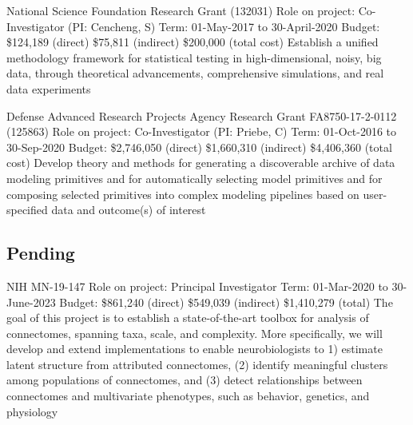 \documentclass[10pt,colorlinks=true,urlcolor=blue]{moderncv}
\begin{document}
{\newline National Science Foundation Research Grant (132031)
\newline Role on project: Co-Investigator (PI: Cencheng, S)
\newline Term: 01-May-2017 to 30-April-2020
\newline Budget: \$124,189 (direct) \$75,811 (indirect) \$200,000 (total cost)
\newline Establish a unified methodology framework for statistical testing in high-dimensional, noisy,
big data, through theoretical advancements, comprehensive simulations, and real data
experiments}{}{}{}{}

{\newline Defense Advanced Research Projects Agency Research Grant FA8750-17-2-0112 (125863)
\newline Role on project: Co-Investigator (PI: Priebe, C)
\newline Term: 01-Oct-2016 to 30-Sep-2020
\newline Budget: \$2,746,050 (direct) \$1,660,310 (indirect) \$4,406,360 (total cost)
\newline Develop theory and methods for generating a discoverable archive of data modeling
primitives and for automatically selecting model primitives and for composing selected primitives into complex
modeling pipelines based on user-specified data and outcome(s) of interest}{}{}{}{}


\subsection{Pending}

{\newline NIH MN-19-147
\newline Role on project: Principal Investigator
\newline Term: {01-Mar-2020} to 30-June-2023
\newline Budget: \$861,240 (direct) \$549,039 (indirect) \$1,410,279 (total)
\newline The goal of this project is to establish a state-of-the-art toolbox for analysis of
connectomes, spanning taxa, scale, and complexity. More specifically, we will develop and
extend implementations to enable neurobiologists to 1) estimate latent structure from
attributed connectomes, (2) identify meaningful clusters among populations of
connectomes, and (3) detect relationships between connectomes and multivariate
phenotypes, such as behavior, genetics, and physiology}{}{}{}{}
\end{document}
